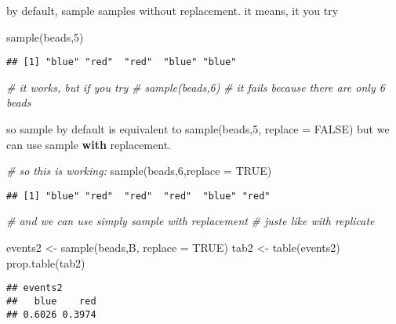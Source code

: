 \documentclass[
]{book}
\newenvironment{Shaded}{\begin{snugshade}}{\end{snugshade}}
\newcommand{\AttributeTok}[1]{\textcolor[rgb]{0.77,0.63,0.00}{#1}}
\newcommand{\CommentTok}[1]{\textcolor[rgb]{0.56,0.35,0.01}{\textit{#1}}}
\newcommand{\ConstantTok}[1]{\textcolor[rgb]{0.00,0.00,0.00}{#1}}
\newcommand{\DecValTok}[1]{\textcolor[rgb]{0.00,0.00,0.81}{#1}}
\newcommand{\FunctionTok}[1]{\textcolor[rgb]{0.00,0.00,0.00}{#1}}
\newcommand{\NormalTok}[1]{#1}
\newcommand{\OtherTok}[1]{\textcolor[rgb]{0.56,0.35,0.01}{#1}}
\begin{document}
by default, sample samples without replacement.
it means, it you try

\begin{Shaded}
\begin{Highlighting}[]
\FunctionTok{sample}\NormalTok{(beads,}\DecValTok{5}\NormalTok{)}
\end{Highlighting}
\end{Shaded}

\begin{verbatim}
## [1] "blue" "red"  "red"  "blue" "blue"
\end{verbatim}

\begin{Shaded}
\begin{Highlighting}[]
\CommentTok{\# it works, but if you try}
\CommentTok{\# sample(beads,6)}
\CommentTok{\# it fails because there are only 6 beads}
\end{Highlighting}
\end{Shaded}

so sample by default is equivalent to
sample(beads,5, replace = FALSE)
but we can use sample \textbf{with} replacement.

\begin{Shaded}
\begin{Highlighting}[]
\CommentTok{\# so this is working:}
\FunctionTok{sample}\NormalTok{(beads,}\DecValTok{6}\NormalTok{,}\AttributeTok{replace =} \ConstantTok{TRUE}\NormalTok{)}
\end{Highlighting}
\end{Shaded}

\begin{verbatim}
## [1] "blue" "red"  "red"  "red"  "blue" "red"
\end{verbatim}

\begin{Shaded}
\begin{Highlighting}[]
\CommentTok{\# and we can use simply sample with replacement}
\CommentTok{\# juste like with replicate}

\NormalTok{events2 }\OtherTok{\textless{}{-}} \FunctionTok{sample}\NormalTok{(beads,B, }\AttributeTok{replace =} \ConstantTok{TRUE}\NormalTok{)}
\NormalTok{tab2 }\OtherTok{\textless{}{-}} \FunctionTok{table}\NormalTok{(events2)}
\FunctionTok{prop.table}\NormalTok{(tab2)}
\end{Highlighting}
\end{Shaded}

\begin{verbatim}
## events2
##   blue    red 
## 0.6026 0.3974
\end{verbatim}
\end{document}
